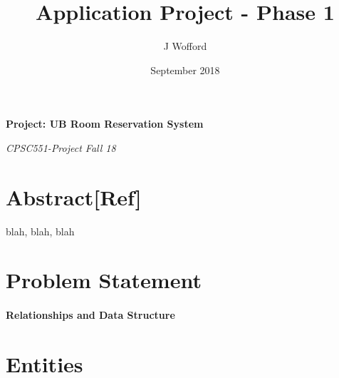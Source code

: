 \documentclass[11pt]{report}
\title{Application Project - Phase 1}
\author{J Wofford}
\date{September 2018}
\begin{document}
\raggedright


\begin{titlepage}
   \begin{center}
      \Large\textbf{Project: UB Room Reservation System}
      
     \vspace*{3\bigskipamount}
      \large\bfseries\textit{}
      
      \large\textit{CPSC551-Project Fall 18}
   \end{center}
\end{titlepage}

\section*{Abstract\hfill [Ref]}
blah, blah, blah

\section*{Problem Statement}

\paragraph{Relationships and Data Structure}

\section*{Entities}
\end{document}
